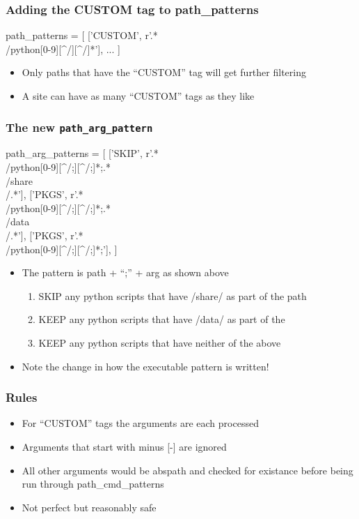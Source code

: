 \documentclass{beamer}
\begin{document}
\begin{frame}[fragile]
    \frametitle{Adding the CUSTOM tag to path\_patterns}
 {\tiny
    \begin{semiverbatim}
path_patterns = [
    ['CUSTOM',  r'.*\\/python[0-9][^/][^/]*'],
    ...
]
    \end{semiverbatim}
}
  \begin{itemize}
    \item Only paths that have the ``CUSTOM'' tag will get further filtering
    \item A site can have as many ``CUSTOM'' tags as they like
  \end{itemize}

\end{frame}

\begin{frame}[fragile]
    \frametitle{The new \texttt{path\_arg\_pattern}}
 {\tiny
    \begin{semiverbatim}
path_arg_patterns = [
  ['SKIP', r'.*\\/python[0-9][^/;][^/;]*;.*\\/share\\/.*'],
  ['PKGS', r'.*\\/python[0-9][^/;][^/;]*;.*\\/data\\/.*'],
  ['PKGS', r'.*\\/python[0-9][^/;][^/;]*;'],
]
    \end{semiverbatim}
}
  \begin{itemize}
    \item The pattern is path + ``;'' + arg as shown above
      \begin{enumerate}
        \item SKIP any python scripts that have /share/ as part of the
          path
        \item KEEP any python scripts that have /data/ as part of the
        \item KEEP any python scripts that have neither of the above
      \end{enumerate}
    \item Note the change in how the executable pattern is written!
  \end{itemize}

\end{frame}

\begin{frame}[fragile]
    \frametitle{Rules}
 {\tiny
    \begin{semiverbatim}
    \end{semiverbatim}
}
  \begin{itemize}
    \item For ``CUSTOM'' tags the arguments are each processed
    \item Arguments that start with minus [-] are ignored
    \item All other arguments would be abspath and checked for existance
      before being run through path\_cmd\_patterns
    \item Not perfect but reasonably safe
  \end{itemize}
\end{frame}
\end{document}
